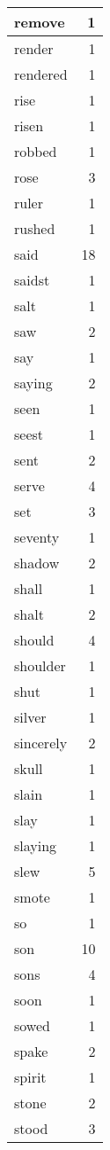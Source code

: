 \begin{center}
\begin{longtable}{l|r}
remove & 1\\ \hline 
render & 1\\ \hline 
rendered & 1\\ \hline 
rise & 1\\ \hline 
risen & 1\\ \hline 
robbed & 1\\ \hline 
rose & 3\\ \hline 
ruler & 1\\ \hline 
rushed & 1\\ \hline 
said & 18\\ \hline 
saidst & 1\\ \hline 
salt & 1\\ \hline 
saw & 2\\ \hline 
say & 1\\ \hline 
saying & 2\\ \hline 
seen & 1\\ \hline 
seest & 1\\ \hline 
sent & 2\\ \hline 
serve & 4\\ \hline 
set & 3\\ \hline 
seventy & 1\\ \hline 
shadow & 2\\ \hline 
shall & 1\\ \hline 
shalt & 2\\ \hline 
should & 4\\ \hline 
shoulder & 1\\ \hline 
shut & 1\\ \hline 
silver & 1\\ \hline 
sincerely & 2\\ \hline 
skull & 1\\ \hline 
slain & 1\\ \hline 
slay & 1\\ \hline 
slaying & 1\\ \hline 
slew & 5\\ \hline 
smote & 1\\ \hline 
so & 1\\ \hline 
son & 10\\ \hline 
sons & 4\\ \hline 
soon & 1\\ \hline 
sowed & 1\\ \hline 
spake & 2\\ \hline 
spirit & 1\\ \hline 
stone & 2\\ \hline 
stood & 3\\ \hline 

\end{longtable}
\end{center}
